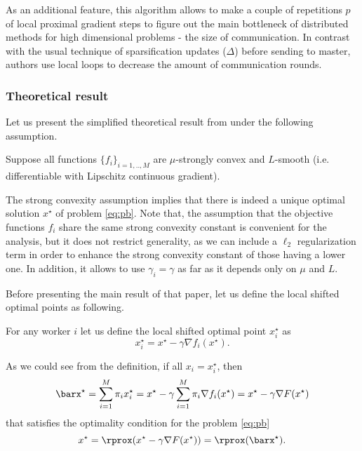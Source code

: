As an additional feature, this algorithm allows to make a couple of repetitions $p$ of local proximal gradient steps to figure out the main bottleneck of distributed methods for high dimensional problems - the size of communication. In contrast with the usual technique of sparsification updates ($\Delta$) before sending to master, authors use local loops to decrease the amount of communication rounds. 

\subsubsection{Theoretical result}
Let us present the {\color{red}simplified} theoretical result from \cite{mishchenko2018} under the following assumption.

\begin{assumption}[On problem]\label{hyp:basic:problem}
    Suppose all functions $\{f_i\}_{i=1,..,M}$ are $\mu$-strongly convex and $L$-smooth (i.e. differentiable with Lipschitz continuous gradient).
\end{assumption}

The strong convexity assumption implies that there is indeed a unique optimal solution $x^\star$ of problem \eqref{eq:pb}. Note that, the assumption that the objective functions $f_i$ share the same strong convexity constant is convenient for the analysis, but it does not restrict generality, as we can include a $\ell_2$ regularization term in order to enhance the strong convexity constant of those having a lower one. In addition, it allows to use $\gamma_i = \gamma$ as far as it depends only on $\mu$ and $L$.

Before presenting the main result of that paper, let us define the local shifted optimal points as following.

\begin{definition}\label{def:basics:localoptim}
For any worker $i$ let us define the local shifted optimal point $x_i^\star$ as
\begin{equation}
x_i^\star = x^\star - \gamma\nabla f_i(x^\star).
\end{equation}
\end{definition}

As we could see from the definition, if all $x_i = x_i^\star$, then 
$$
\barx^\star = \sum_{i=1}^M\pi_ix_i^\star = x^\star - \gamma\sum_{i=1}^M\pi_i\nabla f_i(x^\star) = x^\star - \gamma\nabla F(x^\star)
$$
that satisfies the optimality condition for the problem \eqref{eq:pb}
$$
x^\star = \rprox(x^\star - \gamma\nabla F(x^\star)) = \rprox(\barx^\star).
$$




